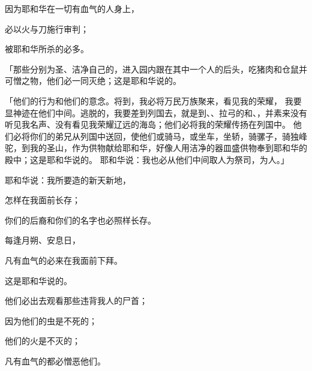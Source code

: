 {\par }{\Q {}因为耶和华在一切有血气的人身上，
\par }{\Q 必以火与刀施行审判；
\par }{\Q 被耶和华所杀的必多。
\par }{\PP {}「那些分别为圣、洁净自己的，进入园内跟在其中一个人的后头，吃猪肉和仓鼠并可憎之物，他们必一同灭绝；这是耶和华说的。
\par }{\PP {}「{}他们的行为和他们的意念。{}将到，我必将万民万族聚来，看见我的荣耀，
我要显神迹在他们中间。逃脱的，我要差到列国去，就是到{}、{}、拉弓的{}和{}、{}，并素来没有听见我名声、没有看见我荣耀辽远的海岛；他们必将我的荣耀传扬在列国中。
他们必将你们的弟兄从列国中送回，使他们或骑马，或坐车，坐轿，骑骡子，骑独峰驼，到我的圣山{}，作为供物献给耶和华，好像{}人用洁净的器皿盛供物奉到耶和华的殿中；这是耶和华说的。
耶和华说：我也必从他们中间取人为祭司，为{}人。」
\par }{\BB \par }{\Q {}耶和华说：我所要造的新天新地，
\par }{\Q 怎样在我面前长存；
\par }{\Q 你们的后裔和你们的名字也必照样长存。
\par }{\Q {}每逢月朔、安息日，
\par }{\Q 凡有血气的必来在我面前下拜。
\par }{\Q 这是耶和华说的。
\par }{\Q {}他们必出去观看那些违背我人的尸首；
\par }{\Q 因为他们的虫是不死的；
\par }{\Q 他们的火是不灭的；
\par }{\Q 凡有血气的都必憎恶他们。
\par }